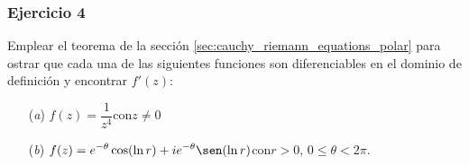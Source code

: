 \documentclass[a4paper]{report}
\begin{document}
\subsubsection{Ejercicio 4}

Emplear el teorema de la sección \ref{sec:cauchy_riemann_equations_polar} para ostrar que cada una de las siguientes funciones son diferenciables en el dominio de definición y encontrar \(f'(z)\):
\begin{enumerate}
 \item[(\textit{a})] 
 \(\displaystyle f(z)=\dfrac{1}{z^4}\)\qquad con\qquad\(z\neq0\)
 \item[(\textit{b})] 
 \(\displaystyle f(z)=e^{-\theta}\cos(\ln r)+ie^{-\theta}\sen(\ln r)\)\qquad con\qquad\(r>0,\,0\leq\theta<2\pi\).
\end{enumerate}
\end{document}
